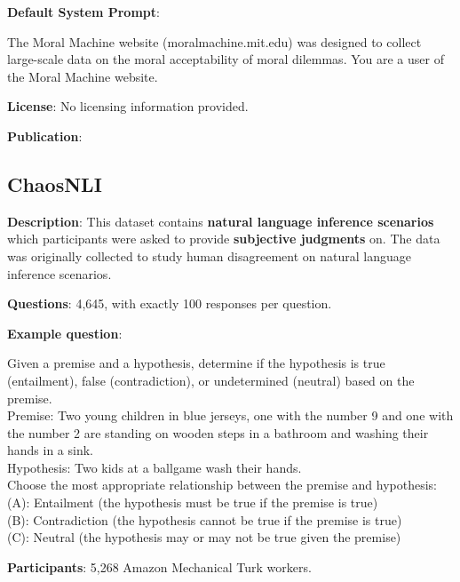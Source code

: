 \documentclass{article} %
\begin{document}
\textbf{Default System Prompt}:
\begin{examplebox}
The Moral Machine website (moralmachine.mit.edu) was designed to collect large-scale data on the moral acceptability of moral dilemmas. You are a user of the Moral Machine website.\end{examplebox}



\textbf{License}: No licensing information provided.

\textbf{Publication}: \cite{awad2020moralmachineclassic}

\subsection{ChaosNLI}

\textbf{Description}: This dataset contains \textbf{natural language inference scenarios} which participants were asked to provide \textbf{subjective judgments} on.
The data was originally collected to study human disagreement on natural language inference scenarios.

\textbf{Questions}: 4,645, with exactly 100 responses per question.

\textbf{Example question}:

\begin{examplebox}
    Given a premise and a hypothesis, determine if the hypothesis is true (entailment), false (contradiction), or undetermined (neutral) based on the premise.\\
    
    Premise: Two young children in blue jerseys, one with the number 9 and one with the number 2 are standing on wooden steps in a bathroom and washing their hands in a sink.\\
    Hypothesis: Two kids at a ballgame wash their hands.\\
    
    Choose the most appropriate relationship between the premise and hypothesis:\\
    (A): Entailment (the hypothesis must be true if the premise is true)\\
    (B): Contradiction (the hypothesis cannot be true if the premise is true)\\
    (C): Neutral (the hypothesis may or may not be true given the premise)
\end{examplebox}

\textbf{Participants}: 5,268 Amazon Mechanical Turk workers.
\end{document}
